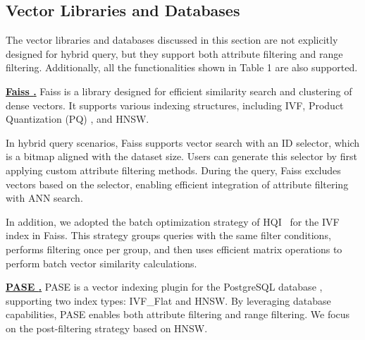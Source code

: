 \documentclass[sigconf, nonacm]{acmart}
\begin{document}
\begin{sloppypar}
\subsection{Vector Libraries and Databases}

The vector libraries and databases discussed in this section are not explicitly designed for hybrid query, but they support both attribute filtering and range filtering. Additionally, all the functionalities shown in Table 1 are also supported.

\vspace{1em}
\noindent\textbf{\underline{Faiss \cite{Faiss}.}}  
Faiss is a library designed for efficient similarity search and clustering of dense vectors. It supports various indexing structures, including IVF, Product Quantization (PQ) \cite{PQ}, and HNSW.

In hybrid query scenarios, Faiss supports vector search with an ID selector, which is a bitmap aligned with the dataset size. Users can generate this selector by first applying custom attribute filtering methods. During the query, Faiss excludes vectors based on the selector, enabling efficient integration of attribute filtering with ANN search.

In addition, we adopted the batch optimization strategy of HQI~\cite{HQI} for the IVF index in Faiss. This strategy groups queries with the same filter conditions, performs filtering once per group, and then uses efficient matrix operations to perform batch vector similarity calculations.

\vspace{1em}
\noindent\textbf{\underline{PASE \cite{pase}.}}  
PASE is a vector indexing plugin for the PostgreSQL database \cite{postgresql13.4}, supporting two index types: IVF\_Flat \cite{johnson2019billion} and HNSW. By leveraging database capabilities, PASE enables both attribute filtering and range filtering. We focus on the post-filtering strategy based on HNSW.


\end{sloppypar}
\end{document}
